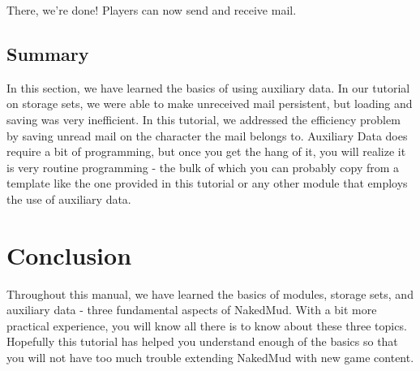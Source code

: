 \documentclass[12pt]{article}
\begin{document}
There, we're done! Players can now send and receive mail.



\subsection{Summary}
In this section, we have learned the basics of using auxiliary data. In our tutorial on storage sets, we were able to make unreceived mail persistent, but loading and saving was very inefficient. In this tutorial, we addressed the efficiency problem by saving unread mail on the character the mail belongs to. Auxiliary Data does require a bit of programming, but once you get the hang of it, you will realize it is very routine programming - the bulk of which you can probably copy from a template like the one provided in this tutorial or any other module that employs the use of auxiliary data.



\newpage \section{Conclusion}
Throughout this manual, we have learned the basics of modules, storage sets, and auxiliary data - three fundamental aspects of NakedMud. With a bit more practical experience, you will know all there is to know about these three topics. Hopefully this tutorial has helped you understand enough of the basics so that you will not have too much trouble extending NakedMud with new game content.



\appendix
\end{document}
